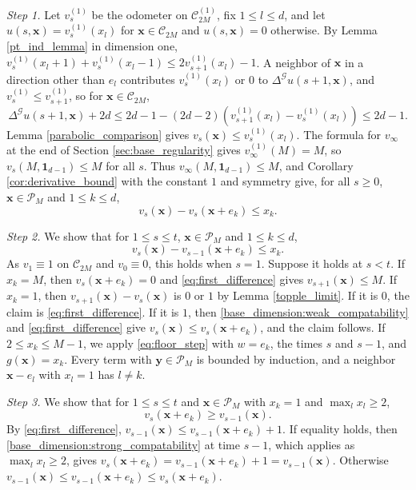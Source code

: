 \documentclass[12pt]{amsart}
\begin{document}
{\it Step 1.}
Let $v^{(1)}_s$ be the odometer on $\mathcal{C}^{(1)}_{2M}$, fix $1 \leq l \leq d$, and let $u(s, \mathbf{x}) = v^{(1)}_s(x_l)$ for $\mathbf{x} \in \mathcal{C}_{2M}$ and $u(s, \mathbf{x}) = 0$ otherwise.
By Lemma \ref{pt_ind_lemma} in dimension one, $v^{(1)}_s(x_l + 1) + v^{(1)}_s(x_l - 1) \leq 2 v^{(1)}_{s+1}(x_l) - 1$.
A neighbor of $\mathbf{x}$ in a direction other than $e_l$ contributes $v^{(1)}_s(x_l)$ or $0$ to $\Delta^{\mathcal{G}} u(s+1, \mathbf{x})$, and $v^{(1)}_s \leq v^{(1)}_{s+1}$, so for $\mathbf{x} \in \mathcal{C}_{2M}$,
\[
\Delta^{\mathcal{G}} u(s+1, \mathbf{x}) + 2d \leq 2d - 1 - (2d - 2) \left( v^{(1)}_{s+1}(x_l) - v^{(1)}_s(x_l) \right) \leq 2d - 1.
\]
Lemma \ref{parabolic_comparison} gives $v_s(\mathbf{x}) \leq v^{(1)}_s(x_l)$.
The formula for $v_{\infty}$ at the end of Section \ref{sec:base_regularity} gives $v^{(1)}_{\infty}(M) = M$, so $v_s(M, \mathbf{1}_{d-1}) \leq M$ for all $s$.
Thus $v_{\infty}(M, \mathbf{1}_{d-1}) \leq M$, and Corollary \ref{cor:derivative_bound} with the constant $1$ and symmetry give, for all $s \geq 0$, $\mathbf{x} \in \mathcal{P}_M$ and $1 \leq k \leq d$,
\begin{equation} \label{eq:first_difference}
v_s(\mathbf{x}) - v_s(\mathbf{x} + e_k) \leq x_k.
\end{equation}

{\it Step 2.}
We show that for $1 \leq s \leq t$, $\mathbf{x} \in \mathcal{P}_M$ and $1 \leq k \leq d$,
\begin{equation} \label{eq:time_difference}
v_s(\mathbf{x}) - v_{s-1}(\mathbf{x} + e_k) \leq x_k.
\end{equation}
As $v_1 \equiv 1$ on $\mathcal{C}_{2M}$ and $v_0 \equiv 0$, this holds when $s = 1$. Suppose it holds at $s < t$.
If $x_k = M$, then $v_s(\mathbf{x} + e_k) = 0$ and \eqref{eq:first_difference} gives $v_{s+1}(\mathbf{x}) \leq M$.
If $x_k = 1$, then $v_{s+1}(\mathbf{x}) - v_s(\mathbf{x})$ is $0$ or $1$ by Lemma \ref{topple_limit}.
If it is $0$, the claim is \eqref{eq:first_difference}.
If it is $1$, then \eqref{base_dimension:weak_compatability} and \eqref{eq:first_difference} give $v_s(\mathbf{x}) \leq v_s(\mathbf{x} + e_k)$, and the claim follows.
If $2 \leq x_k \leq M-1$, we apply \eqref{eq:floor_step} with $w = e_k$, the times $s$ and $s-1$, and $g(\mathbf{x}) = x_k$.
Every term with $\mathbf{y} \in \mathcal{P}_M$ is bounded by induction, and a neighbor $\mathbf{x} - e_l$ with $x_l = 1$ has $l \neq k$.

{\it Step 3.}
We show that for $1 \leq s \leq t$ and $\mathbf{x} \in \mathcal{P}_M$ with $x_k = 1$ and $\max_l x_l \geq 2$,
\begin{equation} \label{eq:facet_lag}
v_s(\mathbf{x} + e_k) \geq v_{s-1}(\mathbf{x}).
\end{equation}
By \eqref{eq:first_difference}, $v_{s-1}(\mathbf{x}) \leq v_{s-1}(\mathbf{x} + e_k) + 1$.
If equality holds, then \eqref{base_dimension:strong_compatability} at time $s-1$, which applies as $\max_l x_l \geq 2$, gives $v_s(\mathbf{x} + e_k) = v_{s-1}(\mathbf{x} + e_k) + 1 = v_{s-1}(\mathbf{x})$.
Otherwise $v_{s-1}(\mathbf{x}) \leq v_{s-1}(\mathbf{x} + e_k) \leq v_s(\mathbf{x} + e_k)$.
\end{document}
